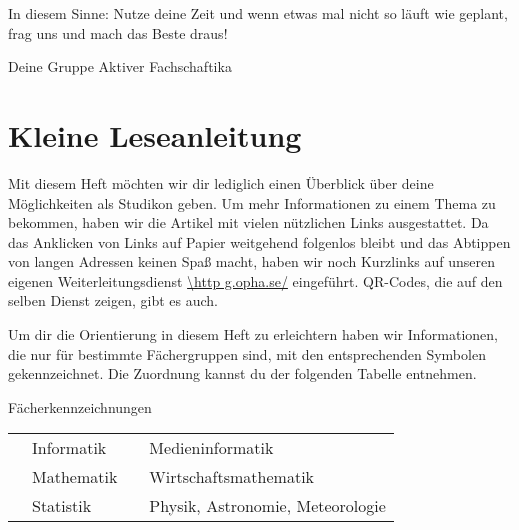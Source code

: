 In diesem Sinne: Nutze deine Zeit und wenn etwas mal nicht so läuft wie geplant, frag uns und mach das Beste draus!

Deine Gruppe Aktiver Fachschaftika

\chapter{Kleine Leseanleitung}

Mit diesem Heft möchten wir dir lediglich einen Überblick über deine Möglichkeiten als Studikon geben. Um mehr Informationen zu einem Thema zu bekommen, haben wir die Artikel mit vielen nützlichen Links ausgestattet. Da das Anklicken von Links auf Papier weitgehend folgenlos bleibt und das Abtippen von langen Adressen keinen Spaß macht, haben wir noch Kurzlinks auf unseren eigenen Weiterleitungsdienst \mbox{\url{\http g.opha.se/}} eingeführt. QR-Codes, die auf den selben Dienst zeigen, gibt es auch.

Um dir die Orientierung in diesem Heft zu erleichtern haben wir Informationen, die nur für bestimmte Fächergruppen sind, mit den entsprechenden Symbolen gekennzeichnet. Die Zuordnung kannst du der folgenden Tabelle entnehmen.

\begin{table*}[h]
	\centering
	Fächerkennzeichnungen
	\begin{tabular}{ l l l l }
		\subjectI & Informatik  & \subjectMI & Medieninformatik \\[1.5mm]
		\subjectM & Mathematik   & \subjectW  & Wirtschaftsmathematik \\[1.5mm]
		\subjectS & Statistik    & \subjectP  & Physik, Astronomie, Meteorologie
	\end{tabular}
\end{table*}

